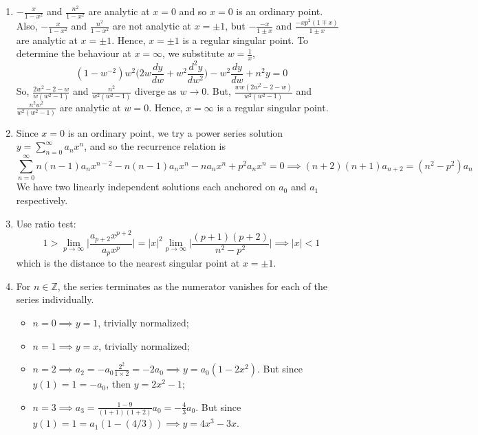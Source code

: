 \documentclass[a4paper]{article}
\begin{document}
\begin{ans}\leavevmode
\begin{enumerate}[label=(\alph*)]
\item $-\frac{x}{1-x^2}$ and $\frac{n^2}{1-x^2}$ are analytic at $x=0$ and so $x=0$ is an ordinary point. Also, $-\frac{x}{1-x^2}$ and  $\frac{n^2}{1-x^2}$ are not analytic at $x=\pm 1$, but $-\frac{-x}{1\pm x}$ and $\frac{-xp^2(1\mp x)}{1\pm x}$ are analytic at $x=\pm1$. Hence, $x=\pm 1$ is a regular singular point. To determine the behaviour at $x=\infty$, we substitute $w=\frac{1}{x}$,
$$(1-w^{-2})w^2\bigg(2w\frac{dy}{dw}+w^2\frac{d^2y}{dw^2}\bigg)-w^2\frac{dy}{dw}+n^2y=0$$
So, $\frac{2w^2-2-w}{w(w^2-1)}$ and $\frac{n^2}{w^2(w^2-1)}$ diverge as $w\rightarrow 0$. But, $\frac{ww(2w^2-2-w)}{w^2(w^2-1)}$ and $\frac{n^2w^2}{w^2(w^2-1)}$ are analytic at $w=0$. Hence, $x=\infty$ is a regular singular point.
\item Since $x=0$ is an ordinary point, we try a power series solution $y=\sum_{n=0}^\infty a_nx^n$, and so the recurrence relation is
$$\sum_{n=0}^\infty n(n-1)a_nx^{n-2}-n(n-1)a_nx^n-na_nx^n+p^2a_nx^n=0\implies (n+2)(n+1)a_{n+2}=(n^2-p^2)a_n$$
We have two linearly independent solutions each anchored on $a_0$ and $a_1$ respectively.
\item Use ratio test:
$$1>\lim_{p\rightarrow\infty}\bigg|\frac{a_{p+2}x^{p+2}}{a_px^p}\bigg|=|x|^2\lim_{p\rightarrow\infty}\bigg|\frac{(p+1)(p+2)}{n^2-p^2}\bigg|\implies|x|<1$$
which is the distance to the nearest singular point at $x=\pm 1$.
\item For $n\in\mathbb{Z}$, the series terminates as the numerator vanishes for each of the series individually. 
\begin{itemize}
    \item $n=0\implies y=1$, trivially normalized;
    \item $n=1\implies y=x$, trivially normalized;
    \item $n=2\implies a_2=-a_0\frac{2^2}{1\times 2}=-2a_0\implies y=a_0(1-2x^2)$. But since $y(1)=1=-a_0$, then $y=2x^2-1$;
    \item $n=3\implies a_3=\frac{1-9}{(1+1)(1+2)}a_0=-\frac{4}{3}a_0$. But since $y(1)=1=a_1(1-(4/3))\implies y=4x^3-3x$.
\end{itemize}
\end{enumerate}
\end{ans}
\newpage
\end{document}
